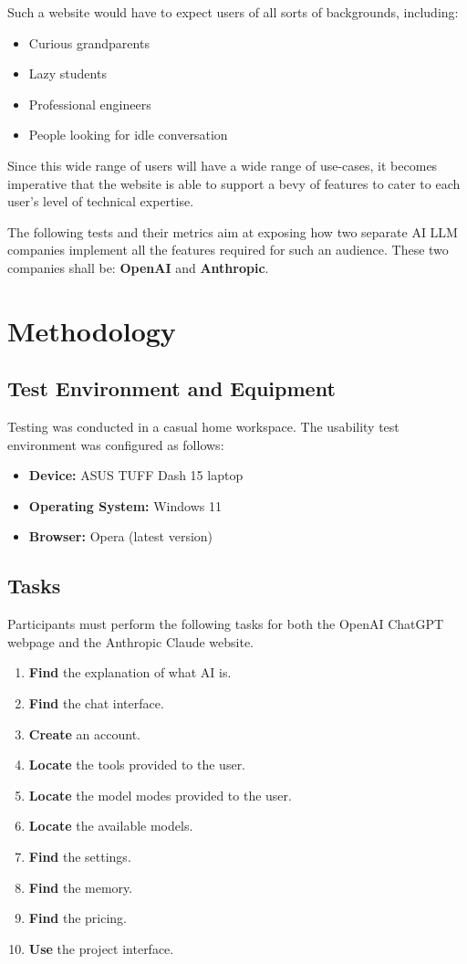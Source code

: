 \documentclass[12pt, letterpaper]{article}
\begin{document}
Such a website would have to expect users of all sorts of backgrounds, including:
\begin{itemize}[noitemsep]
    \item Curious grandparents
    \item Lazy students
    \item Professional engineers
    \item People looking for idle conversation
\end{itemize}

Since this wide range of users will have a wide range of use-cases, it becomes imperative that the website is able to support a bevy of features to cater to each user's level of technical expertise. 

The following tests and their metrics aim at exposing how two separate AI LLM companies implement all the features required for such an audience. These two companies shall be: \textbf{OpenAI} and \textbf{Anthropic}.

\section{Methodology}

\subsection{Test Environment and Equipment}
Testing was conducted in a casual home workspace. The usability test environment was configured as follows:
\begin{itemize}[noitemsep]
    \item \textbf{Device:} ASUS TUFF Dash 15 laptop
    \item \textbf{Operating System:} Windows 11
    \item \textbf{Browser:} Opera (latest version)
\end{itemize}

\subsection{Tasks}
Participants must perform the following tasks for both the OpenAI ChatGPT webpage and the Anthropic Claude website. 
\begin{enumerate}[noitemsep]
    \item \textbf{Find} the explanation of what AI is.
    \item \textbf{Find} the chat interface.
    \item \textbf{Create} an account.
    \item \textbf{Locate} the tools provided to the user.
    \item \textbf{Locate} the model modes provided to the user.
    \item \textbf{Locate} the available models.
    \item \textbf{Find} the settings.
    \item \textbf{Find} the memory.
    \item \textbf{Find} the pricing.
    \item \textbf{Use} the project interface.
\end{enumerate}
\end{document}
